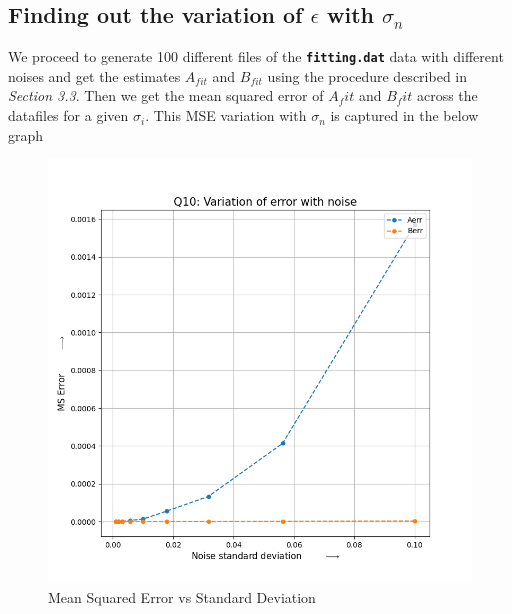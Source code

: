\documentclass[11pt, a4paper]{article}
\begin{document}
        \subsection{Finding out the variation of $\epsilon$ with $\sigma_n$}
            We proceed to generate 100 different files of the \texttt{\textbf{fitting.dat}} data with different noises and get the estimates $A_{fit}$ and $B_{fit}$ using the procedure described in \emph{Section 3.3}. Then we get the mean squared error of $A_fit$ and $B_fit$ across the datafiles for a given $\sigma_i$. This MSE variation with $\sigma_n$ is captured in the below graph
            \begin{figure}[H]
                \centering
                \includegraphics[scale=0.75]{error_plot.png}  %
                \caption{Mean Squared Error vs Standard Deviation}
                \label{fig:errorSTD}
            \end{figure}
\end{document}
